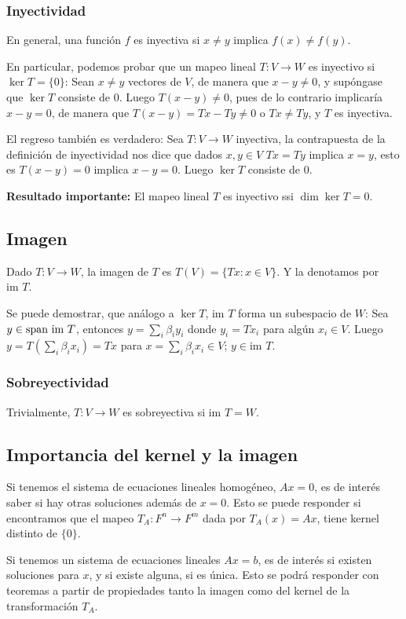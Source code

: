 \documentclass{article}
\begin{document}
\subsubsection*{Inyectividad}
En general, una función $f$ es inyectiva si $x\neq y$ implica
$f(x) \neq f(y)$.

En particular, podemos probar que un mapeo lineal $T: V\rightarrow W$
es inyectivo si $\ker T = \{0\}$: Sean $x\neq y$ vectores de $V$,
de manera que $x-y\neq 0$, y supóngase que $\ker T$ consiste de $0$. Luego $T(x-y) \neq 0$, pues de lo contrario implicaría $x-y = 0$,
de manera que $T(x-y) = Tx - Ty \neq 0$ o $Tx \neq Ty$, y $T$ es
inyectiva.

El regreso también es verdadero: Sea $T: V\rightarrow W$ inyectiva,
la contrapuesta de la definición de inyectividad nos dice que
dados $x,y\in V$
$Tx = Ty$ implica $x = y$, esto es $T(x-y) = 0$ implica $x-y = 0$.
Luego $\ker T$ consiste de $0$.

\textbf{Resultado importante:}
El mapeo lineal $T$ es inyectivo ssi $\dim\ker T = 0$.

\newcommand{\im}{\text{im }}
\subsection{Imagen}
Dado $T: V\rightarrow W$, la imagen de $T$ es
$T(V) = \{Tx: x\in V\}$. Y la denotamos por $\im T$.

Se puede demostrar, que análogo a $\ker T$, $\im T$ forma un
subespacio de $W$: Sea $y\in \spn\im T$, entonces
$y=\sum_i \beta_i y_i$ donde $y_i=Tx_i$ para algún $x_i\in V$.
Luego $y=T(\sum_i \beta_i x_i) = Tx$ para
$x=\sum_i \beta_i x_i \in V$; $y\in\im T$.

\subsubsection*{Sobreyectividad}
Trivialmente, $T: V\rightarrow W$ es sobreyectiva si $\im T = W$.

\subsection{Importancia del kernel y la imagen}
Si tenemos el sistema de ecuaciones lineales homogéneo, $Ax=0$,
es de interés saber si hay otras soluciones además de $x=0$.
Esto se puede responder si encontramos que el mapeo $T_A: F^n \rightarrow F^m$
dada por $T_A(x) = Ax$, tiene kernel distinto de $\{0\}$.

Si tenemos un sistema de ecuaciones lineales $Ax=b$, es de
interés si existen soluciones para $x$, y si existe alguna,
si es única. Esto se podrá responder con teoremas a partir de propiedades tanto la imagen como del kernel de la transformación $T_A$.
\end{document}
